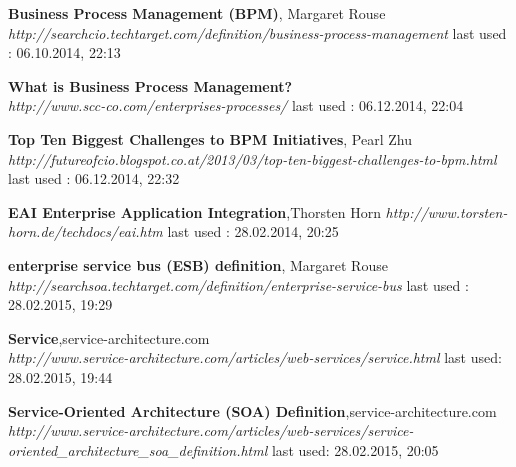 \documentclass[12pt]{article}
\begin{document}
\begin{thebibliography}{56}
   \textbf{Business Process Management (BPM)}, Margaret Rouse\\
  \textit{http://searchcio.techtarget.com/definition/business-process-management}
  \newline last used : 06.10.2014, 22:13
 
 
   \textbf{What is Business Process Management? }\\
  \textit{http://www.scc-co.com/enterprises-processes/}
  \newline last used : 06.12.2014, 22:04


   \textbf{Top Ten Biggest Challenges to BPM Initiatives}, Pearl Zhu\\
  \textit{http://futureofcio.blogspot.co.at/2013/03/top-ten-biggest-challenges-to-bpm.html}
  \newline last used : 06.12.2014, 22:32   

   \textbf{EAI Enterprise Application Integration},Thorsten Horn\newline
  \textit{http://www.torsten-horn.de/techdocs/eai.htm}
  \newline last used : 28.02.2014, 20:25
    	  
   \textbf{enterprise service bus (ESB) definition}, Margaret Rouse\\
  \textit{ http://searchsoa.techtarget.com/definition/enterprise-service-bus}
  \newline last used : 28.02.2015, 19:29 	 
   	     	     	     	  





 
   \textbf{Service},service-architecture.com \\
  \textit{http://www.service-architecture.com/articles/web-services/service.html}
  \newline last used: 28.02.2015, 19:44
     
   \textbf{Service-Oriented Architecture (SOA) Definition},service-architecture.com \\
  \textit{http://www.service-architecture.com/articles/web-services/service-oriented\_architecture\_soa\_definition.html}
  \newline last used: 28.02.2015, 20:05
     
     
  
     
    



\end{thebibliography}
\end{document}
